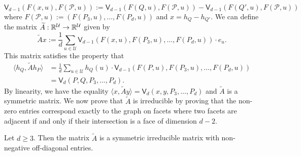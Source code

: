\documentclass{puthesis-UG}
\begin{document}
\[
	\mathsf{V}_{d-1} (F(x, u), F(\mathcal{P}, u)) := \mathsf{V}_{d-1}(F(Q, u), F(\mathcal{P}, u)) - \mathsf{V}_{d-1}(F(Q', u), F(\mathcal{P}, u))
\]
where $F(\mathcal{P}, u) := (F(P_3, u), \ldots, F(P_d, u))$ and $x = h_Q - h_{Q'}$. We can define the matrix $\widetilde{A} : \mathbb{R}^\mathcal{U} \to \mathbb{R}^{\mathcal{U}}$ given by 
\[
	\widetilde{A} x := \frac{1}{d} \sum_{u \in \mathcal{U}} \mathsf{V}_{d-1} (F(x, u), F(P_3, u), \ldots, F(P_d, u)) \cdot e_u.
\]
This matrix satisfies the property that 
\begin{align*}
	\langle h_Q, \widetilde{A} h_P \rangle & = \frac{1}{d} \sum_{u \in \mathcal{U}} h_Q(u) \cdot \mathsf{V}_{d-1} (F(P, u), F(P_3, u), \ldots, F(P_d, u)) \\
	& = \mathsf{V}_d (P, Q, P_3, \ldots, P_d).
\end{align*}
By linearity, we have the equality $\langle x, \widetilde{A} y \rangle = \mathsf{V}_d (x, y, P_3, \ldots, P_d)$ and $\widetilde{A}$ is a symmetric matrix. We now prove that $\widetilde{A}$ is irreducible by proving that the non-zero entries correspond exactly to the graph on facets where two facets are adjacent if and only if their intersection is a face of dimension $d-2$. 

\begin{lem} \label{lemma-structure-of-matrix-widetilde-A}
	Let $d \geq 3$. Then the matrix $\widetilde{A}$ is a symmetric irreducible matrix with non-negative off-diagonal entries. 	
\end{lem}
\end{document}
